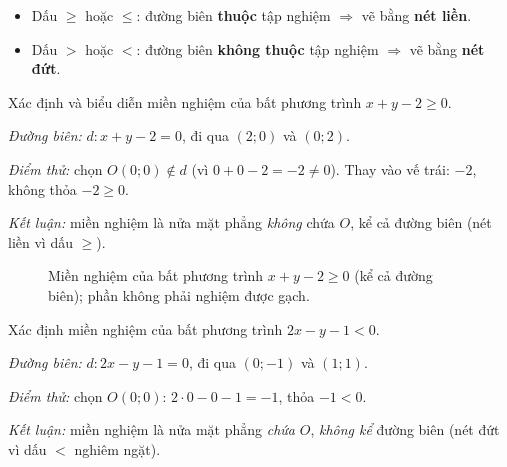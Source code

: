\documentclass[12pt,a4paper]{report}
\begin{document}
\begin{notebox}
\begin{itemize}
\item Dấu $\ge$ hoặc $\le$: đường biên \textbf{thuộc} tập nghiệm $\Rightarrow$ vẽ bằng \textbf{nét liền}.
\item Dấu $>$ hoặc $<$: đường biên \textbf{không thuộc} tập nghiệm $\Rightarrow$ vẽ bằng \textbf{nét đứt}.
\end{itemize}
\end{notebox}

\begin{examplebox}[ 1]
Xác định và biểu diễn miền nghiệm của bất phương trình $x+y-2\ge 0$.

\emph{Đường biên:} $d: x+y-2=0$, đi qua $(2;0)$ và $(0;2)$.

\emph{Điểm thử:} chọn $O(0;0)\notin d$ (vì $0+0-2=-2\ne 0$). Thay vào vế trái: $-2$, không thỏa $-2\ge 0$.

\emph{Kết luận:} miền nghiệm là nửa mặt phẳng \emph{không} chứa $O$, kể cả đường biên (nét liền vì dấu $\ge$).
\end{examplebox}

\begin{figure}[H]
\centering
{}
\caption{Miền nghiệm của bất phương trình $x+y-2\ge 0$ (kể cả đường biên); phần không phải nghiệm được gạch.}
\label{fig:vd-mien-nghiem-1}
\end{figure}

\begin{examplebox}[ 2]
Xác định miền nghiệm của bất phương trình $2x-y-1<0$.

\emph{Đường biên:} $d: 2x-y-1=0$, đi qua $(0;-1)$ và $(1;1)$.

\emph{Điểm thử:} chọn $O(0;0)$: $2\cdot 0-0-1=-1$, thỏa $-1<0$.

\emph{Kết luận:} miền nghiệm là nửa mặt phẳng \emph{chứa} $O$, \emph{không kể} đường biên (nét đứt vì dấu $<$ nghiêm ngặt).
\end{examplebox}
\end{document}
